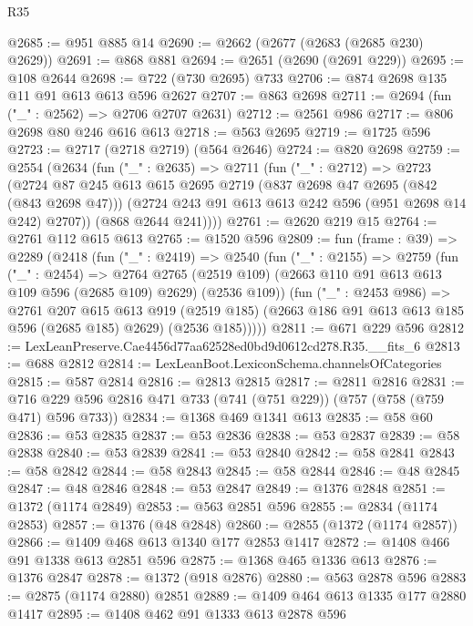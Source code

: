 \begin{lexlean}{R35}
\begin{coremodule}
@2685 := @951 @885 @14
@2690 := @2662 (@2677 (@2683 (@2685 @230) @2629))
@2691 := @868 @881
@2694 := @2651 (@2690 (@2691 @229))
@2695 := @108 @2644
@2698 := @722 (@730 @2695) @733
@2706 := @874 @2698 @135 @11 @91 @613 @613 @596 @2627
@2707 := @863 @2698
@2711 := @2694 (fun ("_" : @2562) => @2706 @2707 @2631)
@2712 := @2561 @986
@2717 := @806 @2698 @80 @246 @616 @613
@2718 := @563 @2695
@2719 := @1725 @596
@2723 := @2717 (@2718 @2719) (@564 @2646)
@2724 := @820 @2698
@2759 := @2554
    (@2634
      (fun ("_" : @2635) =>
      @2711
        (fun ("_" : @2712) =>
        @2723
          (@2724
            @87
            @245
            @613
            @615
            @2695
            @2719
            (@837 @2698 @47 @2695 (@842 (@843 @2698 @47)))
            (@2724 @243 @91 @613 @613 @242 @596 (@951 @2698 @14 @242) @2707))
          (@868 @2644 @241))))
@2761 := @2620 @219 @15
@2764 := @2761 @112 @615 @613
@2765 := @1520 @596
@2809 := fun (frame : @39) =>
  @2289
    (@2418
      (fun ("_" : @2419) =>
      @2540
        (fun ("_" : @2155) =>
        @2759
          (fun ("_" : @2454) =>
          @2764
            @2765
            (@2519 @109)
            (@2663 @110 @91 @613 @613 @109 @596 (@2685 @109) @2629)
            (@2536 @109))
          (fun ("_" : @2453 @986) =>
          @2761
            @207
            @615
            @613
            @919
            (@2519 @185)
            (@2663 @186 @91 @613 @613 @185 @596 (@2685 @185) @2629)
            (@2536 @185)))))
@2811 := @671 @229 @596
@2812 := LexLeanPreserve.Cae4456d77aa62528ed0bd9d0612cd278.R35.__fits_6
@2813 := @688 @2812
@2814 := LexLeanBoot.LexiconSchema.channelsOfCategories
@2815 := @587 @2814
@2816 := @2813 @2815
@2817 := @2811 @2816
@2831 := @716 @229 @596 @2816 @471 @733 (@741 (@751 @229)) (@757 (@758 (@759 @471) @596 @733))
@2834 := @1368 @469 @1341 @613
@2835 := @58 @60
@2836 := @53 @2835
@2837 := @53 @2836
@2838 := @53 @2837
@2839 := @58 @2838
@2840 := @53 @2839
@2841 := @53 @2840
@2842 := @58 @2841
@2843 := @58 @2842
@2844 := @58 @2843
@2845 := @58 @2844
@2846 := @48 @2845
@2847 := @48 @2846
@2848 := @53 @2847
@2849 := @1376 @2848
@2851 := @1372 (@1174 @2849)
@2853 := @563 @2851 @596
@2855 := @2834 (@1174 @2853)
@2857 := @1376 (@48 @2848)
@2860 := @2855 (@1372 (@1174 @2857))
@2866 := @1409 @468 @613 @1340 @177 @2853 @1417
@2872 := @1408 @466 @91 @1338 @613 @2851 @596
@2875 := @1368 @465 @1336 @613
@2876 := @1376 @2847
@2878 := @1372 (@918 @2876)
@2880 := @563 @2878 @596
@2883 := @2875 (@1174 @2880) @2851
@2889 := @1409 @464 @613 @1335 @177 @2880 @1417
@2895 := @1408 @462 @91 @1333 @613 @2878 @596

\end{coremodule}
\end{lexlean}
